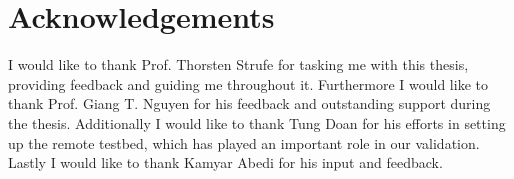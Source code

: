 \chapter*{Acknowledgements}

I would like to thank Prof. Thorsten Strufe for tasking me with this thesis, providing feedback and guiding me throughout it. Furthermore I would like to thank Prof. Giang T. Nguyen for his feedback and outstanding support during the thesis. Additionally I would like to thank Tung Doan for his efforts in setting up the remote testbed, which has played an important role in our validation. Lastly I would like to thank Kamyar Abedi for his input and feedback.
